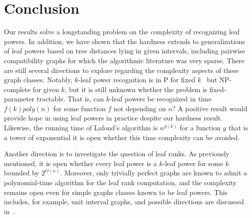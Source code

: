 \documentclass[11pt, letter]{article}
\theoremstyle{remark}
\DeclareMathOperator{\diam}{diam}
\begin{document}
    







\section{Conclusion}

Our results solve a longstanding problem on the complexity of recognizing leaf powers. In addition, we have shown that the hardness extends to generalizations of leaf powers based on tree distances lying in given intervals, including pairwise compatibility graphs for which the algorithmic literature was very sparse.  
There are still several directions to explore regarding the complexity aspects of these graph classes.  Notably, $k$-leaf power recognition is in P for fixed $k$~\cite{Lafond2023} but NP-complete for given $k$, but it is still unknown whether the problem is fixed-parameter tractable.  That is, can $k$-leaf powers be recognized in time $f(k) poly(n)$ for some function $f$ not depending on $n$?  A positive result would provide hope in using leaf powers in practice despite our hardness result.  Likewise, the running time of Lafond's algorithm is $n^{g(k)}$ for a function $g$ that is a tower of exponential it is open whether this time complexity can be avoided.

Another direction is to investigate the question of leaf ranks.  As previously mentioned, it is open whether every leaf power is a $k$-leaf power for some $k$ bounded by $2^{O(n)}$.  Moreover, only trivially perfect graphs are known to admit a polynomial-time algorithm for the leaf rank computation, and the complexity remains open even for simple graphs classes known to be leaf powers.  This includes, for example, unit interval graphs, and possible directions are discussed in~\cite{hogemo2025mapping}.
\end{document}
